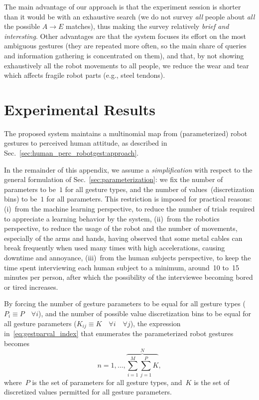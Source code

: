 \bigskip

The main advantage of our approach is that the \hr{} experiment session is shorter than it would be with an exhaustive search (we do not survey \emph{all} people about \emph{all} the possible $A \to E$ matches), thus making the survey relatively \emph{brief and interesting}. Other advantages are that the system focuses its effort on the most ambiguous gestures (they are repeated more often, so the main share of queries and information gathering is concentrated on them), and that, by not showing exhaustively all the robot movements to all people, we reduce the wear and tear which affects fragile robot parts (e.g., steel tendons).

\section{Experimental Results}
\label{sec:human_perc_robotgest:results}

The proposed system maintains a multinomial map from (parameterized) robot gestures to perceived human attitude, as described in Sec.~\ref{sec:human_perc_robotgest:approach}.

In the remainder of this appendix, we assume a \emph{simplification} with respect to the general formulation of Sec.~\ref{sec:parameterization}: we fix the number of parameters to be~$1$ for all gesture types, and the number of values~(discretization bins) to be~$1$ for all parameters. This restriction is imposed for practical reasons: (i)~from the machine learning perspective, to reduce the number of trials required to appreciate a learning behavior by the system, (ii)~from the robotics perspective, to reduce the usage of the robot and the number of movements, especially of the arms and hands, having observed that some metal cables can break frequently when used many times with high accelerations, causing downtime and annoyance, (iii)~from the human subjects perspective, to keep the time spent interviewing each human subject to a minimum, around~10 to~15 minutes per person, after which the possibility of the interviewee becoming bored or tired increases.

By forcing the number of gesture parameters to be equal for all gesture types ($P_i \equiv P \quad \forall i$), and the number of possible value discretization bins to be equal for all gesture parameters ($K_{ij} \equiv K \quad \forall i \quad \forall j$), the expression in~\eqref{eq:gestparval_index} that enumerates the parameterized robot gestures becomes
\begin{equation*}
n = 1, \ldots, \overbrace{\sum_{i=1}^M \sum_{j=1}^P K}^N,
\end{equation*}
where~$P$ is the set of parameters for all gesture types, and~$K$ is the set of discretized values permitted for all gesture parameters.

